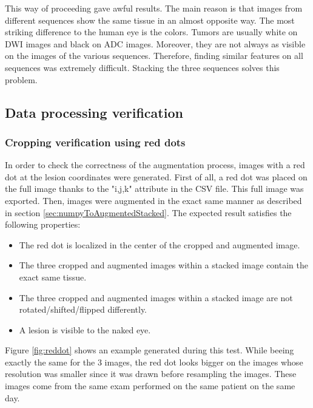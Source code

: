 This way of proceeding gave awful results. The main reason is that images from different sequences show the same tissue in an almost opposite way. The most striking difference to the human eye is the colors. Tumors are usually white on DWI images and black on ADC images. Moreover, they are not always as visible on the images of the various sequences. Therefore, finding similar features on all sequences was extremely difficult. Stacking the three sequences solves this problem. 


\subsection{Data processing verification}
\label{sec:dataProcessingVerification}
\subsubsection{Cropping verification using red dots}
\setlength{\marginparwidth}{3cm}\leavevmode {}In order to check the correctness of the augmentation process, images with a red dot at the lesion coordinates were generated. First of all, a red dot was placed on the full image thanks to the "i,j,k" attribute in the CSV file. This full image was exported. Then, images were augmented in the exact same manner as described in section \ref{sec:numpyToAugmentedStacked}. The expected result satisfies the following properties:
\begin{itemize}
	\item The red dot is localized in the center of the cropped and augmented image.
	\item The three cropped and augmented images within a stacked image contain the exact same tissue. 
	\item The three cropped and augmented images within a stacked image are not rotated/shifted/flipped differently. 
	\item A lesion is visible to the naked eye. 
\end{itemize}

\noindent Figure \ref{fig:reddot} shows an example generated during this test. While beeing exactly the same for the 3 images, the red dot looks bigger on the images whose resolution was smaller since it was drawn before resampling the images. These images come from the same exam performed on the same patient on the same day. 

